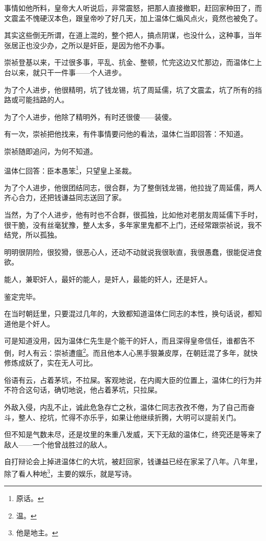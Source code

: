 \begin{multicols}{\theparacolNo}
		事情如他所料，皇帝大人听说后，非常震怒，把那人直接撤职，赶回家种田了，而文震孟不愧硬汉本色，跟皇帝吵了好几天，加上温体仁煽风点火，竟然也被免了。

		其实这些倒无所谓，在道上混的，整个把人，搞点阴谋，也没什么，这种事，当年张居正也没少办，之所以是奸臣，是因为他不办事。

		崇祯登基以来，干过很多事，平乱、抗金、整顿，忙完这边又忙那边，而温体仁上台以来，就只干一件事——个人进步。

		为了个人进步，他很精明，坑了钱龙锡，坑了周延儒，坑了文震孟，坑了所有的挡路或可能挡路的人。

		为了个人进步，他除了精明外，有时还很傻——装傻。

		有一次，崇祯把他找来，有件事情要问他的看法，温体仁当即回答：不知道。

		崇祯随即追问，为何不知道。

		温体仁回答：臣本愚笨\footnote{原话。}，只望皇上圣裁。

		为了个人进步，他很团结同志，很合群，为了整倒钱龙锡，他拉拢了周延儒，两人齐心合力，还把钱谦益同志送回了家。

		当然，为了个人进步，他有时也不合群，很孤独，比如他对老朋友周延儒下手时，很干脆，没有丝毫犹豫，整人太多，多年家里鬼都不上门，还经常跟崇祯说，我不结党，所以孤独。

		明明很阴险，很狡猾，很恶心人，还动不动就说我很耿直，我很愚蠢，很能促进食欲。

		能人，兼职奸人，最奸的能人，是奸人，最能的奸人，还是奸人。

		鉴定完毕。

		在当时朝廷里，只要混过几年的，大致都知道温体仁同志的本性，换句话说，都知道他是个奸人。

		可是知道没用，因为温体仁先生是个能干的奸人，而且深得皇帝信任，谁都告不倒，时人有云：崇祯遭瘟\footnote{温。}。而且他本人心黑手狠兼皮厚，在朝廷混了多年，就快修炼成妖了，实在无人可比。

		俗语有云，占着茅坑，不拉屎。客观地说，在内阁大臣的位置上，温体仁的行为并不符合这句话，确切地说，他占着茅坑，只拉屎。

		外敌入侵，内乱不止，诚此危急存亡之秋，温体仁同志孜孜不倦，为了自己而奋斗，整人、挖坑，忙得不亦乐乎，如果让他继续折腾，大明可以提前关门。

		但不知是气数未尽，还是坟里的朱重八发威，天下无敌的温体仁，终究还是等来了敌人——一个他曾战胜过的敌人。

		自打辩论会上掉进温体仁的大坑，被赶回家，钱谦益已经在家呆了八年。八年里，除了看人种地\footnote{他是地主。}，主要的娱乐，就是写诗。


\end{multicols}
